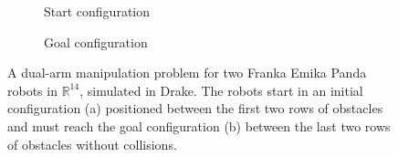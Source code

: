 \begin{figure}[!t]
    \centering
    \begin{subfigure}[b]{0.19\textwidth}
        \centering
        \captionsetup{justification=centering}
        \caption{Start configuration}
        \label{subfig:cage_start_orbit}
    \end{subfigure}\hspace{0.01\textwidth}
    \begin{subfigure}[b]{0.19\textwidth}
        \centering
        \captionsetup{justification=centering}
        \caption{Goal configuration}
        \label{subfig:cage_goal_orbit}
    \end{subfigure}
    \caption{A dual-arm manipulation problem for two Franka Emika Panda robots in $\mathbb{R}^{14}$, simulated in Drake. The robots start in an initial configuration (a) positioned between the first two rows of obstacles and must reach the goal configuration (b) between the last two rows of obstacles without collisions.}
    \label{fig:simulation}
\end{figure}

